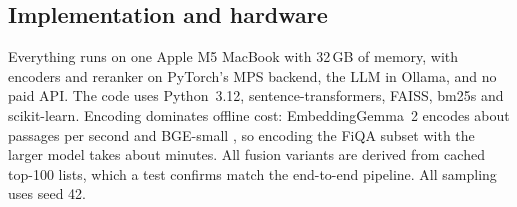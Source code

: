 \subsection{Implementation and hardware}
Everything runs on one Apple M5 MacBook with 32\,GB of memory, with encoders
and reranker on PyTorch's MPS backend, the LLM in Ollama, and no paid API. The
code uses Python~3.12, sentence-transformers, FAISS, bm25s and scikit-learn.
Encoding dominates offline cost: EmbeddingGemma~2 encodes about
\GemmaDocsPerSec{} passages per second and BGE-small \BGEDocsPerSec{}, so
encoding the FiQA subset with the larger model takes about
\FiQAEncodeMinGemma{} minutes. All fusion variants are derived from cached
top-100 lists, which a test confirms match the end-to-end pipeline. All
sampling uses seed 42.
